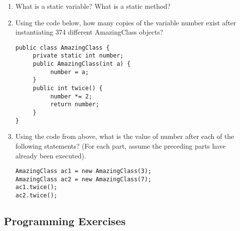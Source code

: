 \setcounter{counter}{1}
\begin{enumerate}[label={\arabic{counter}\addtocounter{counter}{1}}.]

\item What is a static variable? What is a static method?

\item Using the code below, how many copies of the variable number exist after instantiating 374 different AmazingClass objects?
\begin{lstlisting}
public class AmazingClass {
     private static int number;
     public AmazingClass(int a) {
          number = a;
     }
     public int twice() {
          number *= 2;
          return number;
     }
}
\end{lstlisting}

\item Using the code from above, what is the value of number after each of the following statements? (For each part, assume the preceding parts have already been executed).
\begin{lstlisting}
AmazingClass ac1 = new AmazingClass(3);
AmazingClass ac2 = new AmazingClass(7);
ac1.twice();
ac2.twice();
\end{lstlisting}

\end{enumerate}

\subsection{Programming Exercises}